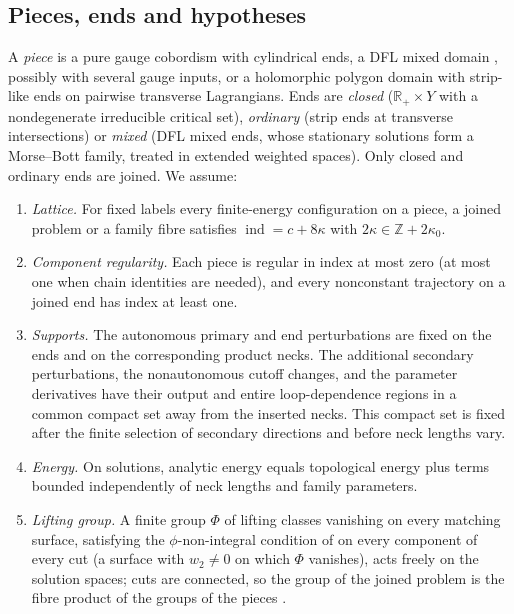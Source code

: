 \documentclass[11pt]{amsart}
\theoremstyle{definition}
\theoremstyle{remark}
\theoremstyle{plain}
\numberwithin{equation}{section}
\newcommand{\ZZ}{\mathbb{Z}}
\newcommand{\RR}{\mathbb{R}}
\newcommand{\ind}{\operatorname{ind}}
\begin{document}
\subsection{Pieces, ends and hypotheses}

A \emph{piece} is a pure gauge cobordism with cylindrical ends, a DFL
mixed domain \cite[Section~3.1]{DFL}, possibly with several gauge inputs,
or a holomorphic polygon domain with strip-like ends on pairwise
transverse Lagrangians. Ends are \emph{closed} ($\RR_+\times Y$ with a
nondegenerate irreducible critical set), \emph{ordinary} (strip ends at
transverse intersections) or \emph{mixed} (DFL mixed ends, whose stationary solutions form a
Morse--Bott family, treated in extended weighted spaces). Only closed and ordinary ends are joined. We assume:
\begin{enumerate}[label=(H\arabic*)]
\item\label{H:lattice} \emph{Lattice.} For fixed labels every
  finite-energy configuration on a piece, a joined problem or a family
  fibre satisfies $\ind=c+8\kappa$ with $2\kappa\in\ZZ+2\kappa_0$.
\item\label{H:regular} \emph{Component regularity.} Each piece is regular
  in index at most zero (at most one when chain identities are needed),
  and every nonconstant trajectory on a joined end has index at least
  one.
\item\label{H:support} \emph{Supports.} The autonomous primary and end
  perturbations are fixed on the ends and on the corresponding product
  necks. The additional secondary perturbations, the nonautonomous
  cutoff changes, and the parameter derivatives have their output and
  entire loop-dependence regions in a common compact set away from
  the inserted necks. This compact set is fixed after the finite
  selection of secondary directions and before neck lengths vary.
\item\label{H:energy} \emph{Energy.} On solutions, analytic energy equals
  topological energy plus terms bounded independently of neck lengths
  and family parameters.
\item\label{H:framing} \emph{Lifting group.} A finite group $\Phi$ of lifting classes vanishing on every matching surface, satisfying the
  $\phi$-non-integral condition of \cite[Definition~5.1]{KM-unknot} on every
  component of every cut (a surface with $w_2\ne0$ on which $\Phi$ vanishes),
  acts freely on the solution spaces; cuts are connected, so the group of the
  joined problem is the fibre product of the groups of the pieces
  \cite[Proposition~5.4]{KM-unknot}.
\end{enumerate}
\end{document}
